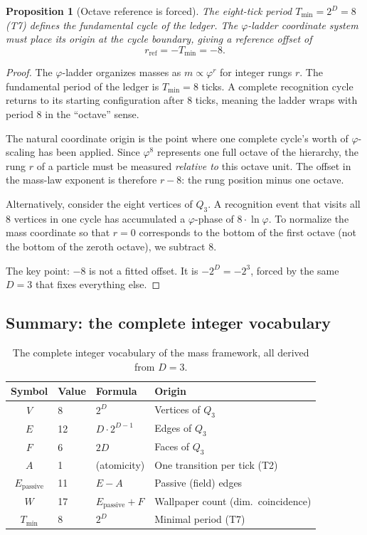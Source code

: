 \documentclass[11pt,a4paper]{article}
\newtheorem{proposition}[theorem]{Proposition}
\theoremstyle{definition}
\theoremstyle{remark}
\newcommand{\phig}{\varphi}
\newcommand{\Epass}{E_{\mathrm{passive}}}
\begin{document}
\begin{proposition}[Octave reference is forced]
\label{prop:octave_minus_8}
The eight-tick period $T_{\min} = 2^D = 8$ (T7) defines the fundamental
cycle of the ledger.  The $\phig$-ladder coordinate system must place its
origin at the cycle boundary, giving a reference offset of
\begin{equation}
  \boxed{r_{\mathrm{ref}} = -T_{\min} = -8.}
  \label{eq:octave_ref}
\end{equation}
\end{proposition}

\begin{proof}
The $\phig$-ladder organizes masses as $m \propto \phig^r$ for integer
rungs $r$.  The fundamental period of the ledger is $T_{\min} = 8$ ticks.
A complete recognition cycle returns to its starting configuration after 8
ticks, meaning the ladder wraps with period 8 in the ``octave'' sense.

The natural coordinate origin is the point where one complete cycle's worth
of $\phig$-scaling has been applied.  Since $\phig^8$ represents one full
octave of the hierarchy, the rung $r$ of a particle must be measured
\emph{relative to} this octave unit.  The offset in the mass-law exponent is
therefore $r - 8$: the rung position minus one octave.

Alternatively, consider the eight vertices of $Q_3$.  A recognition event
that visits all 8 vertices in one cycle has accumulated a $\phig$-phase of
$8 \cdot \ln\phig$.  To normalize the mass coordinate so that $r = 0$
corresponds to the bottom of the first octave (not the bottom of the zeroth
octave), we subtract 8.

The key point: $-8$ is not a fitted offset.  It is $-2^D = -2^3$, forced by
the same $D = 3$ that fixes everything else.
\end{proof}

\subsection{Summary: the complete integer vocabulary}

\begin{table}[h]
\centering
\caption{The complete integer vocabulary of the mass framework, all derived
from $D = 3$.}
\label{tab:integers}
\small
\begin{tabular}{@{}clll@{}}
\toprule
Symbol & Value & Formula & Origin \\
\midrule
$V$ & 8 & $2^D$ & Vertices of $Q_3$ \\
$E$ & 12 & $D \cdot 2^{D-1}$ & Edges of $Q_3$ \\
$F$ & 6 & $2D$ & Faces of $Q_3$ \\
$A$ & 1 & (atomicity) & One transition per tick (T2) \\
$\Epass$ & 11 & $E - A$ & Passive (field) edges \\
$W$ & 17 & $\Epass + F$ & Wallpaper count (dim.\ coincidence) \\
$T_{\min}$ & 8 & $2^D$ & Minimal period (T7) \\
\bottomrule
\end{tabular}
\end{table}
\end{document}
